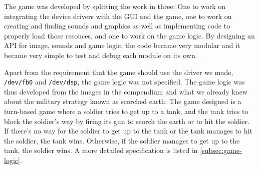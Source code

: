 The game was developed by splitting the work in three: One to work on
integrating the device drivers with the GUI and the game, one to work on
creating and finding sounds and graphics as well as implementing code to
properly load those resouces, and one to work on the game logic. By
designing an API for image, sounds and game logic, the code became
very modular and it became very simple to test and debug each module on
its own.

Apart from the requirement that the game should use the driver we made,
\texttt{/dev/fb0} and \texttt{/dev/dsp}, the game logic was not
specified. The game logic was thus developed from the images in the
compendium\cite{comp} and what we already knew about the military
strategy known as scorched earth: The game designed is a turn-based game
where a soldier tries to get up to a tank, and the tank tries to block
the soldier's way by firing its gun to scorch the earth or to hit the
soldier. If there's no way for the soldier to get up to the tank or the
tank manages to hit the soldier, the tank wins. Otherwise, if the
soldier manages to get up to the tank, the soldier wins. A more detailed
specification is listed in \ref{subsec:game-logic}.

